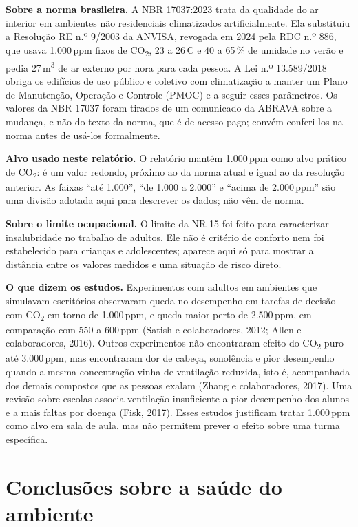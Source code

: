 \documentclass[11pt,a4paper]{article}
\newcommand{\cod}{CO\textsubscript{2}}
\newcommand{\grau}{\,\textdegree C}
\begin{document}
\textbf{Sobre a norma brasileira.} A NBR 17037:2023 trata da qualidade do ar interior em ambientes não residenciais climatizados artificialmente. Ela substituiu a Resolução RE n.º 9/2003 da ANVISA, revogada em 2024 pela RDC n.º 886, que usava 1.000\,ppm fixos de \cod{}, 23 a 26\grau{} e 40 a 65\,\% de umidade no verão e pedia 27\,m\textsuperscript{3} de ar externo por hora para cada pessoa. A Lei n.º 13.589/2018 obriga os edifícios de uso público e coletivo com climatização a manter um Plano de Manutenção, Operação e Controle (PMOC) e a seguir esses parâmetros. Os valores da NBR 17037 foram tirados de um comunicado da ABRAVA sobre a mudança, e não do texto da norma, que é de acesso pago; convém conferi-los na norma antes de usá-los formalmente.

\textbf{Alvo usado neste relatório.} O relatório mantém 1.000\,ppm como alvo prático de \cod{}: é um valor redondo, próximo ao da norma atual e igual ao da resolução anterior. As faixas ``até 1.000'', ``de 1.000 a 2.000'' e ``acima de 2.000\,ppm'' são uma divisão adotada aqui para descrever os dados; não vêm de norma.

\textbf{Sobre o limite ocupacional.} O limite da NR-15 foi feito para caracterizar insalubridade no trabalho de adultos. Ele não é critério de conforto nem foi estabelecido para crianças e adolescentes; aparece aqui só para mostrar a distância entre os valores medidos e uma situação de risco direto.

\textbf{O que dizem os estudos.} Experimentos com adultos em ambientes que simulavam escritórios observaram queda no desempenho em tarefas de decisão com \cod{} em torno de 1.000\,ppm, e queda maior perto de 2.500\,ppm, em comparação com 550 a 600\,ppm (Satish e colaboradores, 2012; Allen e colaboradores, 2016). Outros experimentos não encontraram efeito do \cod{} puro até 3.000\,ppm, mas encontraram dor de cabeça, sonolência e pior desempenho quando a mesma concentração vinha de ventilação reduzida, isto é, acompanhada dos demais compostos que as pessoas exalam (Zhang e colaboradores, 2017). Uma revisão sobre escolas associa ventilação insuficiente a pior desempenho dos alunos e a mais faltas por doença (Fisk, 2017). Esses estudos justificam tratar 1.000\,ppm como alvo em sala de aula, mas não permitem prever o efeito sobre uma turma específica.

\section{Conclusões sobre a saúde do ambiente}
\label{sec:conclusoes}
\end{document}
